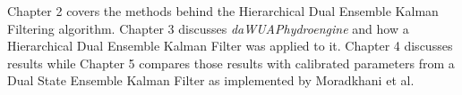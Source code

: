 	Chapter 2 covers the methods behind the Hierarchical Dual Ensemble Kalman Filtering algorithm. Chapter 3 discusses \textit{daWUAPhydroengine} and how a Hierarchical Dual Ensemble Kalman Filter was applied to it. Chapter 4 discusses results while Chapter 5 compares those results with calibrated parameters from a Dual State Ensemble Kalman Filter as implemented by Moradkhani et al.
	
	
	

	